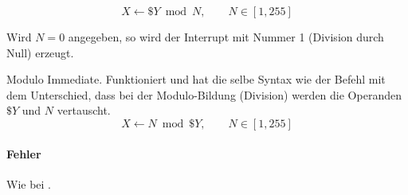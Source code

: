 \[
    X \gets \$Y \bmod N, \qquad N \in [1, 255]
\]

Wird $N = 0$ angegeben, so wird der Interrupt mit Nummer 1 (Division durch
Null) erzeugt.


\glqq Modulo Immediate\grqq.
Funktioniert und hat die selbe Syntax wie der Befehl  mit dem
Unterschied, dass bei der Modulo-Bildung (Division) werden die Operanden $\$Y$
und $N$ vertauscht.
\[
    X \gets N \bmod \$Y, \qquad N \in [1, 255]
\]

\paragraph{Fehler}
Wie bei .


